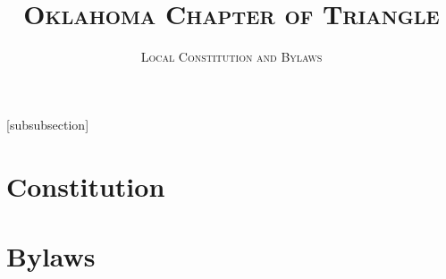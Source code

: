 \documentclass{article}
\title{\textsc{Oklahoma Chapter of Triangle}}
\subtitle{\textsc{Local Constitution and Bylaws}}
\begin{document}
\let\oldsec\section
\let\oldsubsec\subsection
\let\oldsubsubsec\subsubsection
\renewcommand{\part}[1]{\oldsubsec{\textsc{#1}}}
\newcommand{\article}[1]{\oldsubsubsec{\textsc{#1}}}
[subsubsection]
\renewcommand{\section}{
    \stepcounter{ArticleSection}
    \textbf{Section \arabic{ArticleSection}:\ }
}

\setcounter{tocdepth}{3}

\maketitle
\tableofcontents

\setlength\parindent{0pt}
\setlength\parskip{1em}

\pagebreak
\oldsec{Constitution}


\pagebreak
\oldsec{Bylaws}

\end{document}
